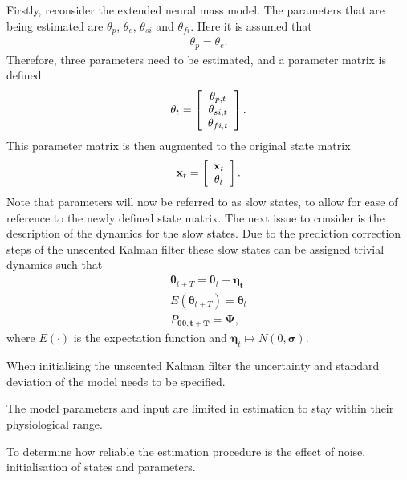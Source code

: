 Firstly, reconsider the extended neural mass model. The parameters that are being estimated are $\theta_{p}$, $\theta_{e}$, $\theta_{si}$ and $\theta_{fi}$. Here it is assumed that \begin{align}
\theta_{p} = \theta_{e}.
\end{align} Therefore, three parameters need to be estimated, and a parameter matrix is defined
\[ \mathbf{\theta}_{t} = \left[ \begin{array}[pos]{c}
\theta_{p,t}\\
\theta_{si,t} \\
\theta_{fi,t} \end{array} \right] .\] This parameter matrix is then augmented to the original state matrix
\[ \mathbf{x}_{t} = \left[ \begin{array}[pos]{c}
\mathbf{x}_{t}\\
\mathbf{\theta}_{t} \end{array} \right] .\] Note that parameters will now be referred to as slow states, to allow for ease of reference to the newly defined state matrix. The next issue to consider is the description of the dynamics for the slow states. Due to the prediction correction steps of the unscented Kalman filter these slow states can be assigned trivial dynamics such that
\begin{align}
\mathbf{\theta}_{t+T} = \mathbf{\theta}_{t} + \mathbf{\eta_{t}}\\
E(\mathbf{\theta}_{t+T}) = \mathbf{\theta}_{t}\\
P_{\mathbf{\theta} \mathbf{\theta,t+T}} = \mathbf{\Psi},
\end{align} where $E(\cdot)$ is the expectation function and $\mathbf{\eta}_{t}\longmapsto N(0,\mathbf{\sigma})$.

When initialising the unscented Kalman filter the uncertainty and standard deviation of the model needs to be specified.

The model parameters and input are limited in estimation to stay within their physiological range.

To determine how reliable the estimation procedure is the effect of noise, initialisation of states and parameters.





